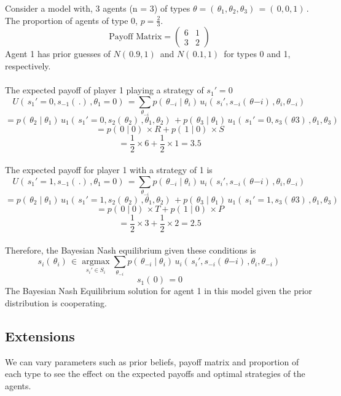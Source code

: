 \documentclass[]{llncs}
\DeclareMathOperator*{\argmax}{argmax}
\begin{document}
Consider a model with, 3 agents (n = 3) of types $\theta = (\, \theta_1, \theta_2, \theta_3)\, = (\, 0,0,1)\,.$\\
The proportion of agents of type 0, $p = \frac{2}{3}$.\\
\[
   \text{Payoff Matrix} = \begin{pmatrix} 
   6 & 1  \\
   3 & 2  
   \end{pmatrix} 
\]
Agent 1 has prior guesses of $N(\,0.9,1)\,$ and $N(\,0.1,1)\,$ for types 0 and 1, respectively. \\
\\
The expected payoff of player 1 playing a strategy of $s_1' = 0$
\[ 
U(\,s_1' = 0,  s_{-1}(\, . )\,, \theta_1 = 0)\, = \sum\limits_{\theta_{-i}} p(\, \theta_{-i} \mid \theta_i)\, u_i(\,s_i', s_{-i}(\, \theta{-i} )\,, \theta_i, \theta_{-i})\, 
\]
\[
= p(\, \theta_{2} \mid \theta_1)\, u_1(\,s_1' = 0, s_{2}(\, \theta_{2} )\,, \theta_1, \theta_{2})\, +  p(\, \theta_{3} \mid \theta_1)\, u_1(\,s_1' = 0, s_{3}(\, \theta{3} )\,, \theta_1, \theta_{3})\,
\] 
\[
= p(\, 0 \mid 0)\,  \times R + p(\, 1 \mid 0)\,  \times S
\]
\[
= \frac{1}{2} \times 6 + \frac{1}{2} \times 1 = 3.5
\]
\\
The expected payoff for player 1 with a strategy of 1 is 
\[ 
U(\,s_1' = 1,  s_{-1}(\, . )\,, \theta_1 = 0)\, = \sum\limits_{\theta_{-i}} p(\, \theta_{-i} \mid \theta_i)\, u_i(\,s_i', s_{-i}(\, \theta{-i} )\,, \theta_i, \theta_{-i})\, 
\]
\[
= p(\, \theta_{2} \mid \theta_1)\, u_1(\,s_1' = 1, s_{2}(\, \theta_{2} )\,, \theta_1, \theta_{2})\, +  p(\, \theta_{3} \mid \theta_1)\, u_1(\,s_1' = 1, s_{3}(\, \theta{3} )\,, \theta_1, \theta_{3})\,
\]
\[
= p(\, 0 \mid 0)\,  \times T + p(\, 1 \mid 0)\,  \times P
\]
\[
= \frac{1}{2} \times 3 + \frac{1}{2} \times 2 = 2.5
\]
\\
Therefore, the Bayesian Nash equilibrium given these conditions is 
\[
s_i(\,\theta_i)\, \in \argmax\limits_{s_i' \in S_i} \sum\limits_{\theta_{-i}} p(\, \theta_{-i} \mid \theta_i)\, u_i(\,s_i', s_{-i}(\, \theta{-i} )\,, \theta_i, \theta_{-i})\,
\]
\[
s_1(\,0)\, = 0
\]
The Bayesian Nash Equilibrium solution for agent 1 in this model given the prior distribution is cooperating. 

\subsection{Extensions}
We can vary parameters such as prior beliefs, payoff matrix and proportion of each type to see the effect on the expected payoffs and optimal strategies of the agents. 
\end{document}
